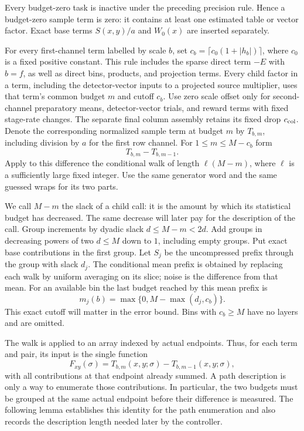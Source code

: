Every budget-zero task is inactive under the preceding precision rule.
Hence a budget-zero sample term is zero: it contains at least one
estimated table or vector factor.  Exact base terms $S(x,y)/a$ and
$W_0(x)$ are inserted separately.

For every first-channel term labelled by scale $b$, set
$c_b=\lceil c_0(1+|h_b|)\rceil$, where $c_0$ is a fixed positive constant.
This rule includes the sparse direct term $-E$ with $b=f$, as well as
direct bins, products, and projection terms.  Every child factor in a
term, including the detector-vector inputs to a projected source
multiplier, uses that term's common budget $m$ and cutoff $c_b$.
Use zero scale offset only for second-channel preparatory means,
detector-vector trials, and reward terms with fixed stage-rate changes.
The separate final column assembly retains its fixed drop
$c_{\rm col}$.  Denote the corresponding normalized
sample term at budget $m$ by $T_{b,m}$, including division by $a$ for the
first row channel.  For $1\le m\le M-c_b$ form
\begin{equation}
 T_{b,m}-T_{b,m-1}.
 \label{eq:est-difference}
\end{equation}
Apply to this difference the conditional walk of length
$\ell(M-m)$, where $\ell$ is a sufficiently large fixed integer.  Use the
same generator word and the same guessed wraps for its two parts.

We call $M-m$ the slack of a child call: it is the amount by which its statistical budget has decreased. The same decrease will later pay for the description of the call. Group increments by dyadic slack
$d\le M-m<2d$.  Add groups in decreasing powers of two $d\le M$ down to
$1$, including empty groups.  Put exact base contributions in the first
group.  Let $S_j$ be the uncompressed prefix through the group with slack
$d_j$.  The conditional mean prefix is obtained by replacing each walk by
uniform averaging on its slice; noise is the difference from that mean.
For an available bin the last budget reached by this mean prefix is
\begin{equation}
 m_j(b)=\max\{0,M-\max(d_j,c_b)\}.
 \label{eq:est-last-budget}
\end{equation}
This exact cutoff will matter in the error bound.  Bins with $c_b\ge M$
have no layers and are omitted.


The walk is applied to an array indexed by actual endpoints.  Thus,
for each term and pair, its input is the single function
\[
 F_{xy}(\sigma)=T_{b,m}(x,y;\sigma)-T_{b,m-1}(x,y;\sigma),
\]
with all contributions at that endpoint already summed.  A path
description is only a way to enumerate those contributions.  In
particular, the two budgets must be grouped at the same actual
endpoint before their difference is measured.  The following lemma
establishes this identity for the path enumeration and also records
the description length needed later by the controller.


